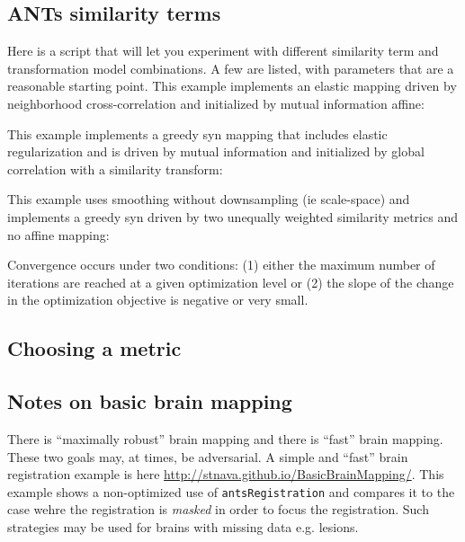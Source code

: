 \documentclass{InsightArticle}
\begin{document}
\subsection{ANTs similarity terms}
Here is a script that will let you experiment with different similarity term 
and transformation model combinations.  A few are listed, with parameters 
that are a reasonable starting point.  This example implements an
elastic mapping driven by neighborhood cross-correlation and initialized by mutual information affine:

This example implements a greedy syn mapping that includes elastic regularization and is driven by mutual
information and initialized by global correlation with a similarity transform:

This example uses smoothing without downsampling (ie scale-space) and
implements a greedy syn driven by two unequally weighted similarity metrics and no affine mapping:

Convergence occurs under two conditions: (1) either the maximum number of 
iterations are reached at a given optimization level or (2) the slope 
of the change in the optimization objective is negative or very small. 


\subsection{Choosing a metric}




\subsection{Notes on basic brain mapping}
There is ``maximally robust'' brain mapping and there is ``fast''
brain mapping.  These two goals may, at times, be adversarial.  
A simple and ``fast'' brain registration example is here
\href{http://stnava.github.io/BasicBrainMapping/}{http://stnava.github.io/BasicBrainMapping/}.
This example shows a non-optimized use of \texttt{antsRegistration}
and compares it to the case wehre the registration is \textit{masked}
in order to focus the registration.  Such strategies may be used for
brains with missing data e.g. lesions.
\end{document}

